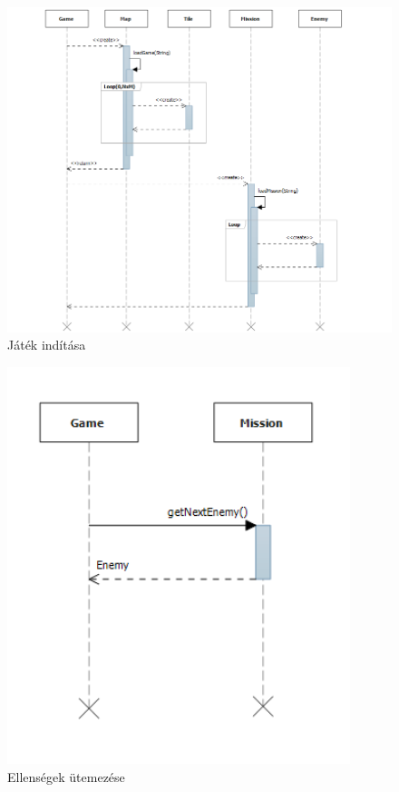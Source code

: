 \begin{figure}[H]
\begin{center}
\includegraphics[width=15cm]{images/starting_game.png}
\caption{Játék indítása}
\label{fig:starting_game}
\end{center}
\end{figure}

\begin{figure}[H]
\begin{center}
\includegraphics[width=10cm]{images/scheduling_enemies.png}
\caption{Ellenségek ütemezése}
\label{fig:scheduling_enemies}
\end{center}
\end{figure}

